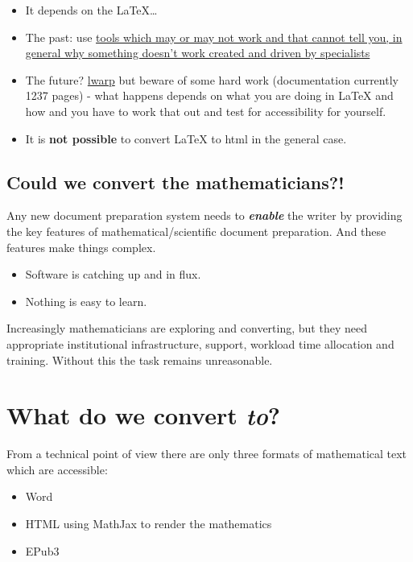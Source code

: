 \documentclass[
  12pt,
  a4paper]{extarticle}
\providecommand{\tightlist}{%
  \setlength{\itemsep}{0pt}\setlength{\parskip}{0pt}}
\renewcommand{\;}{\,}
\begin{document}
\begin{itemize}
\tightlist
\item
  It depends on the LaTeX\ldots{}
\item
  The past: use \href{https://hub.docker.com/r/bathmash/mathaltnotes}{tools which may or may not work and that cannot tell you, in general why something doesn't work created and driven by specialists}
\item
  The future? \href{https://ctan.org/pkg/lwarp?lang=en}{lwarp} but beware of some hard work (documentation currently 1237 pages) - what happens depends on what you are doing in LaTeX and how and you have to work that out and test for accessibility for yourself.
\item
  It is \textbf{not possible} to convert LaTeX to html in the general case.
\end{itemize}

\hypertarget{could-we-convert-the-mathematicians}{%
\subsection{Could we convert the mathematicians?!}\label{could-we-convert-the-mathematicians}}

Any new document preparation system needs to \textbf{\emph{enable}} the writer by providing the key features of mathematical/scientific document preparation. And these features make things complex.

\begin{itemize}
\tightlist
\item
  Software is catching up and in flux.
\item
  Nothing is easy to learn.
\end{itemize}

Increasingly mathematicians are exploring and converting, but they need appropriate institutional infrastructure, support, workload time allocation and training. Without this the task remains unreasonable.

\hypertarget{what-do-we-convert-to}{%
\section{\texorpdfstring{What do we convert \textbf{\emph{to}}?}{What do we convert to?}}\label{what-do-we-convert-to}}

From a technical point of view there are only three formats of mathematical text which are accessible:

\begin{itemize}
\tightlist
\item
  Word
\item
  HTML using MathJax to render the mathematics
\item
  EPub3
\end{itemize}
\end{document}
